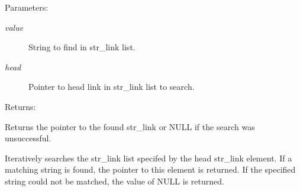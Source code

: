 \begin{Desc}
\item[Parameters: ]\par
\begin{description}
\item[{\em 
value}]String to find in str\_\-link list. \item[{\em 
head}]Pointer to head link in str\_\-link list to search. \end{description}
\end{Desc}
\begin{Desc}
\item[Returns: ]\par
Returns the pointer to the found str\_\-link or NULL if the search was unsuccessful.\end{Desc}
Iteratively searches the str\_\-link list specifed by the head str\_\-link element. If a matching string is found, the pointer to this element is returned. If the specified string could not be matched, the value of NULL is returned. 